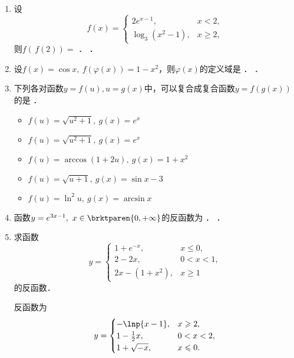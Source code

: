 \begin{enumerate}
\item 设
  \[
    f(x) =
    \begin{cases}
      2e^{x-1}, & x < 2, \\
      \log_3(x^2-1), & x \ge 2,
    \end{cases}
  \]
  则\(f(\,f(2)) =\)
  \ifshowsol
    \uline{}．
  \else
    \uline{\makebox[3em]{}}．
  \fi

\item 设\(f(x) = \cos x,\ f(\varphi(x)) = 1 - x^2\)，则\(\varphi(x)\)的定义域是
  \ifshowsol
    {\setlength{\ULdepth}{.8ex}%
      \uline{}}．
  \else
    \uline{\makebox[6em]{}}．
  \fi

\item 下列各对函数\(y = f(u), u = g(x)\)中，可以复合成复合函数\(y = f(g(x))\)的是
  \uline{\hfill}．
  \begin{itemize}
    \renewcommand{\labelitemi}{\faCircleThin}
    \ifshowsol
    \item[\faCircle] \(f(u) = \sqrt{u^2 + 1},\ g(x) = e^x\)
    \else
    \item \(f(u) = \sqrt{u^2 + 1},\ g(x) = e^x\)
    \fi
  \item \(f(u) = \arccos(1+2u),\ g(x) = 1 + x^2\)
  \item \(f(u) = \sqrt{u+1},\ g(x) = \sin x - 3\)
  \item \(f(u) = \ln^2 u,\ g(x) = \arcsin x\)
  \end{itemize}

\item 函数\(y = e^{3x-1},\ x \in \brktparen{0, +\infty}\)的反函数为
  \ifshowsol
    {\setlength{\ULdepth}{.85ex}%
      \uline{}}．
  \else
    \uline{\makebox[15em]{}}．
  \fi

\item 求函数
  \[
    y =
    \begin{cases}
      1 + e^{-x}, & x \le 0, \\
      2 - 2x, & 0 < x < 1, \\
      2x - (1+x^2), & x \ge 1
    \end{cases}
  \]
  的反函数．

  \ifshowsol
    反函数为
    \[
      y =
      \begin{cases}
        -\lnp{x-1}, & x \ge 2, \\
        1 - \frac12 x, & 0 < x < 2, \\
        1 + \sqrt{-x}, & x \le 0.
      \end{cases}
    \]
  \fi


\end{enumerate}
